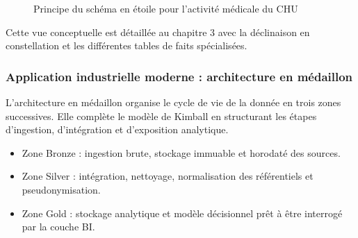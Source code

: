 \documentclass[12pt, a4paper]{report}
\begin{document}
\begin{figure}[H]
  \centering
  \caption{Principe du schéma en étoile pour l’activité médicale du CHU}
\end{figure}

Cette vue conceptuelle est détaillée au chapitre 3 avec la déclinaison en constellation et les différentes tables de faits spécialisées.

\subsubsection{Application industrielle moderne : architecture en médaillon}

L'architecture en médaillon organise le cycle de vie de la donnée en trois zones successives. Elle complète le modèle de Kimball en structurant les étapes d'ingestion, d'intégration et d'exposition analytique.

\begin{itemize}[label=\textcolor{chuBlue}{\textbullet}]
  \item Zone Bronze : ingestion brute, stockage immuable et horodaté des sources.
  \item Zone Silver : intégration, nettoyage, normalisation des référentiels et pseudonymisation.
  \item Zone Gold : stockage analytique et modèle décisionnel prêt à être interrogé par la couche BI.
\end{itemize}
\end{document}

